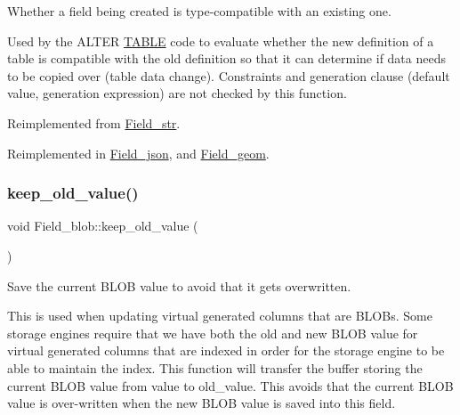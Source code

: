 Whether a field being created is type-\/compatible with an existing one.

Used by the A\+L\+T\+ER \mbox{\hyperlink{structTABLE}{T\+A\+B\+LE}} code to evaluate whether the new definition of a table is compatible with the old definition so that it can determine if data needs to be copied over (table data change). Constraints and generation clause (default value, generation expression) are not checked by this function. 

Reimplemented from \mbox{\hyperlink{classField__str_a281f4c166dbbfd070c6038c8b6f1595a}{Field\+\_\+str}}.



Reimplemented in \mbox{\hyperlink{classField__json_a12d3ba38a6c987f627dce55780947578}{Field\+\_\+json}}, and \mbox{\hyperlink{classField__geom_a20953b29b4a85e8d77f16593313fd381}{Field\+\_\+geom}}.

\mbox{\label{classField__blob_ac227ff512cca0c54fb2942fffb00e4ca}} 
\subsubsection{\texorpdfstring{keep\+\_\+old\+\_\+value()}{keep\_old\_value()}}
{\footnotesize\ttfamily void Field\+\_\+blob\+::keep\+\_\+old\+\_\+value (\begin{DoxyParamCaption}{ }\end{DoxyParamCaption})\hspace{0.3cm}{\ttfamily [inline]}}

Save the current B\+L\+OB value to avoid that it gets overwritten.

This is used when updating virtual generated columns that are B\+L\+O\+Bs. Some storage engines require that we have both the old and new B\+L\+OB value for virtual generated columns that are indexed in order for the storage engine to be able to maintain the index. This function will transfer the buffer storing the current B\+L\+OB value from \textquotesingle{}value\textquotesingle{} to \textquotesingle{}old\+\_\+value\textquotesingle{}. This avoids that the current B\+L\+OB value is over-\/written when the new B\+L\+OB value is saved into this field.

